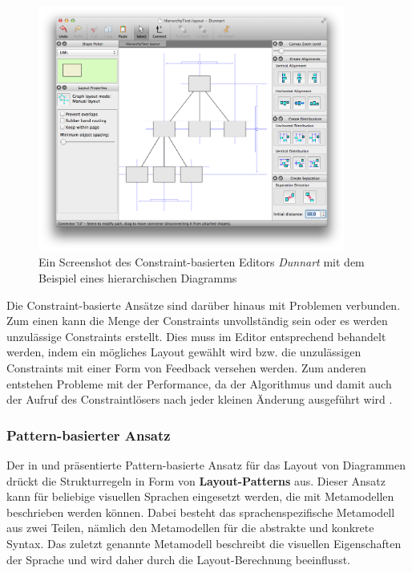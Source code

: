 \begin{figure}[hbt]
    \centering
    \includegraphics[width=0.9\textwidth]{assets/dunnart-screenshot}
    \caption{Ein Screenshot des Constraint-basierten Editors \textit{Dunnart} mit dem Beispiel eines hierarchischen Diagramms}
    \label{fig:dunnart-screenshot}
\end{figure}

Die Constraint-basierte Ansätze sind darüber hinaus mit Problemen verbunden. Zum einen kann die Menge der Constraints unvollständig sein oder es werden unzulässige Constraints erstellt. Dies muss im Editor entsprechend behandelt werden, indem ein mögliches Layout gewählt wird bzw. die unzulässigen Constraints mit einer Form von Feedback versehen werden. Zum anderen entstehen Probleme mit der Performance, da der Algorithmus und damit auch der Aufruf des Constraintlösers  nach jeder kleinen Änderung ausgeführt wird \cite{Maier12A-Pattern-based}.

\subsubsection{Pattern-basierter Ansatz}
\label{subsubsec:pattern-based-approach}

Der in \cite{Maier12A-Pattern-based} und \cite{MaierMinas10Combination} präsentierte Pattern-basierte Ansatz für das Layout von Diagrammen drückt die Strukturregeln in Form von \textbf{Layout-Patterns} aus. Dieser Ansatz kann für beliebige visuellen Sprachen eingesetzt werden, die mit Metamodellen beschrieben werden können. Dabei besteht das sprachenspezifische Metamodell aus zwei Teilen, nämlich den Metamodellen für die abstrakte und konkrete Syntax. Das zuletzt genannte Metamodell beschreibt die visuellen Eigenschaften der Sprache und wird daher durch die Layout-Berechnung beeinflusst.

